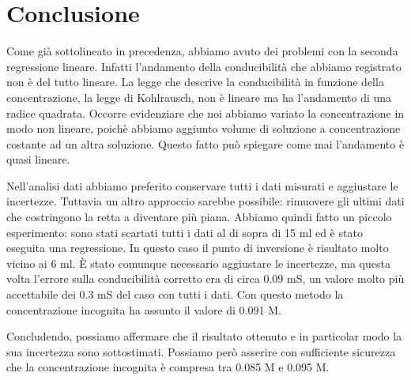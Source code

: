 \section*{Conclusione}

Come già sottolineato in precedenza, abbiamo avuto dei problemi con la seconda regressione lineare.
Infatti l'andamento della conducibilità che abbiamo registrato non è del tutto lineare. La legge che descrive
la conducibilità in funzione della concentrazione, la legge di Kohlrausch, non è lineare ma ha l'andamento di una radice quadrata.
Occorre evidenziare che noi abbiamo variato la concentrazione in modo non lineare, poichè abbiamo aggiunto volume di
soluzione a concentrazione costante ad un altra soluzione. Questo fatto può spiegare come mai l'andamento è quasi lineare.

Nell'analisi dati abbiamo preferito conservare tutti i dati misurati e aggiustare le incertezze. Tuttavia un altro approccio
sarebbe possibile: rimuovere gli ultimi dati che costringono la retta a diventare più piana. Abbiamo quindi fatto un piccolo esperimento:
sono stati scartati tutti i dati al di sopra di 15 ml ed è stato eseguita una regressione. In questo caso il punto di inversione
è risultato molto vicino ai 6 ml. È stato comunque necessario aggiustare le incertezze, ma questa volta l'errore sulla conducibilità corretto
era di circa 0.09 mS, un valore molto più accettabile dei 0.3 mS del caso con tutti i dati. Con questo metodo la concentrazione incognita
ha assunto il valore di 0.091 M. 

Concludendo, possiamo affermare che il risultato ottenuto e in particolar modo la sua incertezza sono sottostimati. Possiamo però asserire con
sufficiente sicurezza che la concentrazione incognita è compresa tra 0.085 M e 0.095 M. 
